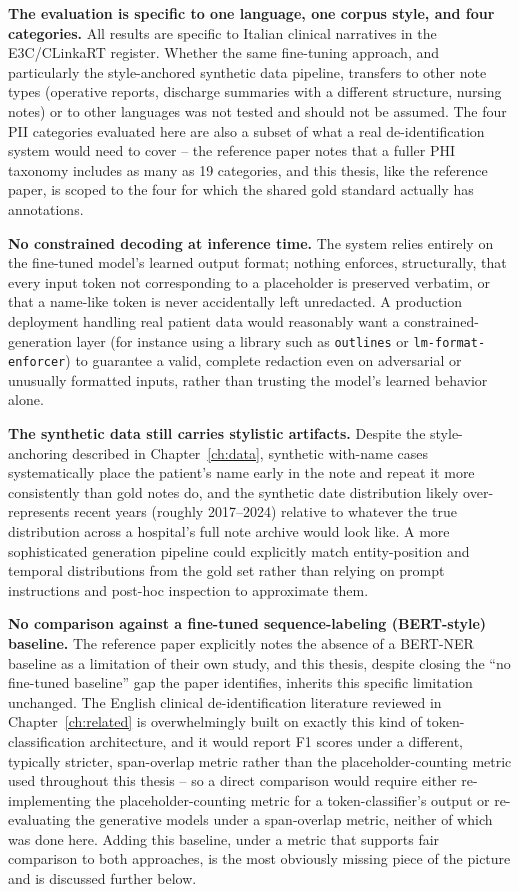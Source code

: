 \documentclass[12pt,a4paper]{report}
\begin{document}
\textbf{The evaluation is specific to one language, one corpus style, and four categories.} All results are specific to Italian clinical narratives in the E3C/CLinkaRT register. Whether the same fine-tuning approach, and particularly the style-anchored synthetic data pipeline, transfers to other note types (operative reports, discharge summaries with a different structure, nursing notes) or to other languages was not tested and should not be assumed. The four PII categories evaluated here are also a subset of what a real de-identification system would need to cover -- the reference paper notes that a fuller PHI taxonomy includes as many as 19 categories, and this thesis, like the reference paper, is scoped to the four for which the shared gold standard actually has annotations.

\textbf{No constrained decoding at inference time.} The system relies entirely on the fine-tuned model's learned output format; nothing enforces, structurally, that every input token not corresponding to a placeholder is preserved verbatim, or that a name-like token is never accidentally left unredacted. A production deployment handling real patient data would reasonably want a constrained-generation layer (for instance using a library such as \texttt{outlines} or \texttt{lm-format-enforcer}) to guarantee a valid, complete redaction even on adversarial or unusually formatted inputs, rather than trusting the model's learned behavior alone.

\textbf{The synthetic data still carries stylistic artifacts.} Despite the style-anchoring described in Chapter~\ref{ch:data}, synthetic with-name cases systematically place the patient's name early in the note and repeat it more consistently than gold notes do, and the synthetic date distribution likely over-represents recent years (roughly 2017--2024) relative to whatever the true distribution across a hospital's full note archive would look like. A more sophisticated generation pipeline could explicitly match entity-position and temporal distributions from the gold set rather than relying on prompt instructions and post-hoc inspection to approximate them.

\textbf{No comparison against a fine-tuned sequence-labeling (BERT-style) baseline.}
\label{sec:limitations-bert}
The reference paper explicitly notes the absence of a BERT-NER baseline as a limitation of their own study, and this thesis, despite closing the ``no fine-tuned baseline'' gap the paper identifies, inherits this specific limitation unchanged. The English clinical de-identification literature reviewed in Chapter~\ref{ch:related} is overwhelmingly built on exactly this kind of token-classification architecture, and it would report F1 scores under a different, typically stricter, span-overlap metric rather than the placeholder-counting metric used throughout this thesis -- so a direct comparison would require either re-implementing the placeholder-counting metric for a token-classifier's output or re-evaluating the generative models under a span-overlap metric, neither of which was done here. Adding this baseline, under a metric that supports fair comparison to both approaches, is the most obviously missing piece of the picture and is discussed further below.
\end{document}
